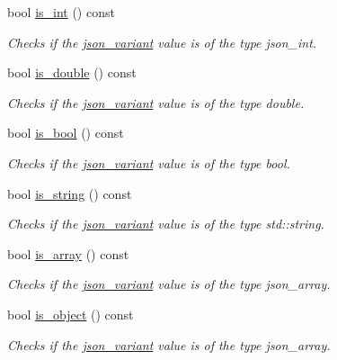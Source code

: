 \begin{DoxyCompactItemize}
bool \hyperlink{classJSONLIB__NAMESPACE_1_1json__variant_a2d6f7d2f92f5c3bfaf9c548a783a97fb}{is\+\_\+int} () const
\begin{DoxyCompactList}\small\item\em Checks if the \hyperlink{classJSONLIB__NAMESPACE_1_1json__variant}{json\+\_\+variant} value is of the type {\itshape json\+\_\+int}. \end{DoxyCompactList}\item 
bool \hyperlink{classJSONLIB__NAMESPACE_1_1json__variant_a7f294ce9b078aca12e0f96df7275ff0b}{is\+\_\+double} () const
\begin{DoxyCompactList}\small\item\em Checks if the \hyperlink{classJSONLIB__NAMESPACE_1_1json__variant}{json\+\_\+variant} value is of the type {\itshape double}. \end{DoxyCompactList}\item 
bool \hyperlink{classJSONLIB__NAMESPACE_1_1json__variant_a99bd3f5d21800b7b1cc7af956c17d534}{is\+\_\+bool} () const
\begin{DoxyCompactList}\small\item\em Checks if the \hyperlink{classJSONLIB__NAMESPACE_1_1json__variant}{json\+\_\+variant} value is of the type {\itshape bool}. \end{DoxyCompactList}\item 
bool \hyperlink{classJSONLIB__NAMESPACE_1_1json__variant_ae097a22fe419dd083ff07bfebf0e8151}{is\+\_\+string} () const
\begin{DoxyCompactList}\small\item\em Checks if the \hyperlink{classJSONLIB__NAMESPACE_1_1json__variant}{json\+\_\+variant} value is of the type {\itshape std\+::string}. \end{DoxyCompactList}\item 
bool \hyperlink{classJSONLIB__NAMESPACE_1_1json__variant_a72349dff71a411ac24eea6d943772df7}{is\+\_\+array} () const
\begin{DoxyCompactList}\small\item\em Checks if the \hyperlink{classJSONLIB__NAMESPACE_1_1json__variant}{json\+\_\+variant} value is of the type {\itshape json\+\_\+array}. \end{DoxyCompactList}\item 
bool \hyperlink{classJSONLIB__NAMESPACE_1_1json__variant_a28b4156626bd9f0e344ba1704c7590f3}{is\+\_\+object} () const
\begin{DoxyCompactList}\small\item\em Checks if the \hyperlink{classJSONLIB__NAMESPACE_1_1json__variant}{json\+\_\+variant} value is of the type {\itshape json\+\_\+array}. \end{DoxyCompactList}\item 

\end{DoxyCompactItemize}

